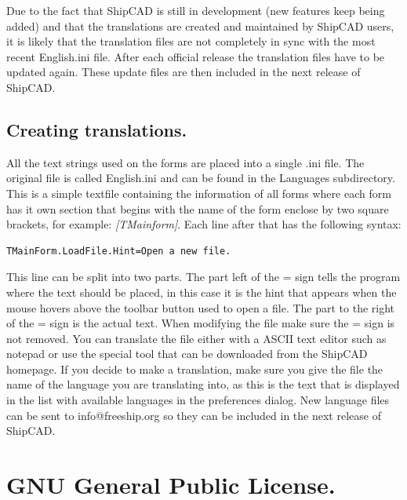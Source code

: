 \documentclass[12pt]{article}
\begin{document}
Due to the fact that ShipCAD is still in development (new features
keep being added) and that the translations are created and maintained
by ShipCAD users, it is likely that the translation files are not
completely in sync with the most recent English.ini file. After each
official release the translation files have to be updated again. These
update files are then included in the next release of ShipCAD.

\subsection{Creating translations.}
All the text strings used on the forms are placed into a single .ini
file. The original file is called English.ini and can be found in the
Languages subdirectory. This is a simple textfile containing the
information of all forms where each form has it own section that
begins with the name of the form enclose by two square brackets, for
example: \textit{[TMainform]}. Each line after that has the following syntax:
\begin{verbatim}
TMainForm.LoadFile.Hint=Open a new file.
\end{verbatim}
This line can be split into two parts. The part left of the = sign
tells the program where the text should be placed, in this case it is
the hint that appears when the mouse hovers above the toolbar button
used to open a file. The part to the right of the = sign is the actual
text. When modifying the file make sure the = sign is not removed. You
can translate the file either with a ASCII text editor such as notepad
or use the special tool that can be downloaded from the ShipCAD
homepage. If you decide to make a translation, make sure you give the
file the name of the language you are translating into, as this is the
text that is displayed in the list with available languages in the
preferences dialog. New language files can be sent to
info@freeship.org so they can be included in the next release of
ShipCAD.

\pagebreak

\section{GNU General Public License.}
\end{document}
